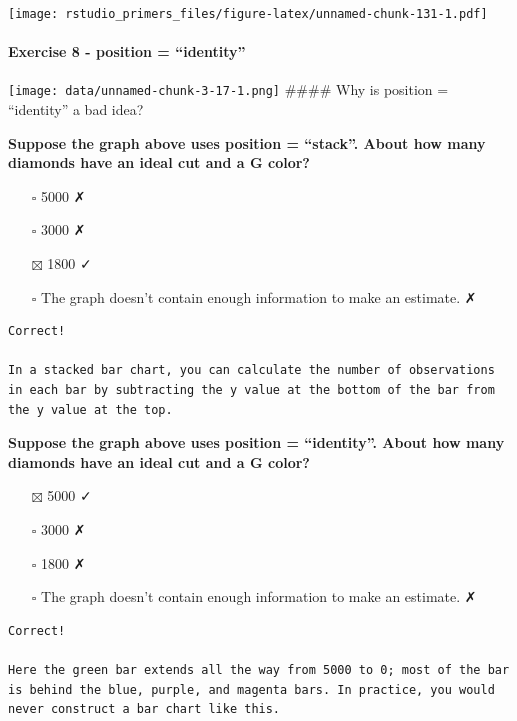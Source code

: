 \documentclass[
]{article}
\providecommand{\tightlist}{%
  \setlength{\itemsep}{0pt}\setlength{\parskip}{0pt}}
\begin{document}
\texttt{[image: rstudio\_primers\_files/figure-latex/unnamed-chunk-131-1.pdf]}

\hypertarget{exercise-8---position-identity}{%
\paragraph{Exercise 8 - position =
``identity''}\label{exercise-8---position-identity}}

\texttt{[image: data/unnamed-chunk-3-17-1.png]} \#\#\#\# Why is position
= ``identity'' a bad idea?

\textbf{Suppose the graph above uses position = ``stack''. About how
many diamonds have an ideal cut and a G color?}

\begin{itemize}
\tightlist
\item[$\square$]
  5000 ✗
\item[$\square$]
  3000 ✗
\item[$\boxtimes$]
  1800 ✓
\item[$\square$]
  The graph doesn't contain enough information to make an estimate. ✗
\end{itemize}

\begin{verbatim}
Correct!

In a stacked bar chart, you can calculate the number of observations in each bar by subtracting the y value at the bottom of the bar from the y value at the top.
\end{verbatim}

\textbf{Suppose the graph above uses position = ``identity''. About how
many diamonds have an ideal cut and a G color?}

\begin{itemize}
\tightlist
\item[$\boxtimes$]
  5000 ✓
\item[$\square$]
  3000 ✗
\item[$\square$]
  1800 ✗
\item[$\square$]
  The graph doesn't contain enough information to make an estimate. ✗
\end{itemize}

\begin{verbatim}
Correct!

Here the green bar extends all the way from 5000 to 0; most of the bar is behind the blue, purple, and magenta bars. In practice, you would never construct a bar chart like this.
\end{verbatim}
\end{document}
